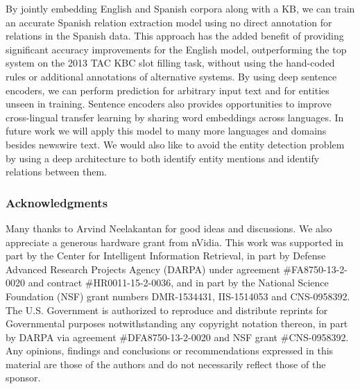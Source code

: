 \documentclass{article} %
\begin{document}
By jointly embedding English and Spanish corpora along with a KB, we can train an accurate Spanish relation extraction model using no direct annotation for relations in the Spanish data. This approach has the added benefit of providing significant accuracy improvements for the English model, outperforming the top system on the 2013 TAC KBC slot filling task, without using the hand-coded rules or additional annotations of alternative systems. By using deep sentence encoders, we can perform prediction for arbitrary input text and for entities unseen in training. Sentence encoders also provides opportunities to improve cross-lingual transfer learning by sharing word embeddings across languages. In future work we will apply this model to many more languages and domains besides newswire text. We would also like to avoid the entity detection problem by using a deep architecture to both identify entity mentions and identify relations between them.

\subsubsection*{Acknowledgments}
Many thanks to Arvind Neelakantan for good ideas and discussions. We also appreciate a generous hardware grant from nVidia. This work was supported in part by the Center for Intelligent Information Retrieval, in part by Defense Advanced Research Projects Agency (DARPA) under agreement \#FA8750-13-2-0020 and contract \#HR0011-15-2-0036, and in part by the National Science Foundation (NSF) grant numbers DMR-1534431, IIS-1514053 and CNS-0958392. The U.S. Government is authorized to reproduce and distribute reprints for Governmental purposes notwithstanding any copyright notation thereon, in part by DARPA via agreement \#DFA8750-13-2-0020 and NSF grant \#CNS-0958392. Any opinions, findings and conclusions or recommendations expressed in this material are those of the authors and do not necessarily reflect those of the sponsor.




\newpage
%
\end{document}
